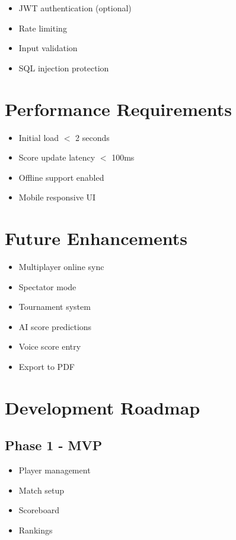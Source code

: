 \documentclass[11pt,a4paper]{article}
\begin{document}
\begin{itemize}
    \item JWT authentication (optional)
    \item Rate limiting
    \item Input validation
    \item SQL injection protection
\end{itemize}

\section{Performance Requirements}

\begin{itemize}
    \item Initial load $<$ 2 seconds
    \item Score update latency $<$ 100ms
    \item Offline support enabled
    \item Mobile responsive UI
\end{itemize}

\section{Future Enhancements}

\begin{itemize}
    \item Multiplayer online sync
    \item Spectator mode
    \item Tournament system
    \item AI score predictions
    \item Voice score entry
    \item Export to PDF
\end{itemize}

\section{Development Roadmap}

\subsection{Phase 1 - MVP}
\begin{itemize}
    \item Player management
    \item Match setup
    \item Scoreboard
    \item Rankings
\end{itemize}
\end{document}
